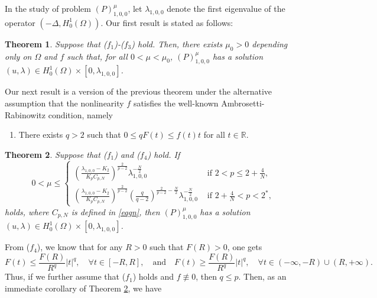 \documentclass[11pt]{amsart}
\newtheorem{theorem}{Theorem}[section]
\newcommand{\abs}[1]{\lvert#1\rvert}
\numberwithin{equation}{section}
\begin{document}
In the study of problem $(P)^{\mu}_{1,0,0}$,  let  $\lambda_{1,0,0}$ denote the first eigenvalue of the operator $(-\Delta, H_{0}^{1}(\Omega))$. Our first result is stated as follows:



\begin{theorem} \label{th2}
 Suppose that ($f_1$)-($f_3$) hold. Then, there exists $\mu_0>0$ depending only on $\Omega$ and $f$ such that, for all $0<\mu<\mu_0$, $(P)^{\mu}_{1,0,0}$ has a solution $(u,\lambda) \in H^1_0(\Omega) \times [0,\lambda_{1,0,0}]$.
\end{theorem}

Our next result is a version of the previous theorem under the alternative assumption that the nonlinearity  $f$ satisfies the well-known Ambrosetti-Rabinowitz condition, namely
\begin{enumerate}[align=left,labelsep=0pt]
    \item[($f_4$)] There exists $q>2$ such that $0 \leq qF(t)\leq f(t)t$ for all $t \in \mathbb{R}$.
\end{enumerate}
\begin{theorem}\label{th3}
    Suppose that ($f_1$) and ($f_4$) hold. If $$0<\mu \leq
  \begin{cases}
    \left(\frac{\lambda_{1,0,0}-K_2}{K_pC_{p,N}}\right)^{\frac{2}{p-2}}\lambda_{1,0,0}^{-\frac{N}{2}}  &\text{ if } 2<p\leq 2+\frac{4}{N},\\
    \left(\frac{\lambda_{1,0,0}-K_2}{K_pC_{p,N}}\right)^{\frac{2}{p-2}}\left(\frac{q}{q-2}\right)^{\frac{2}{p-2}-\frac{N}{2}}\lambda_{1,0,0}^{-\frac{N}{2}} &\text{ if }  2+\frac{4}{N}<p<2^*,
\end{cases}$$
holds, where $C_{p,N}$ is defined in \eqref{eqgn}, then $(P)^{\mu}_{1,0,0}$ has a solution $(u,\lambda) \in H^1_0(\Omega) \times [0,\lambda_{1,0,0}]$.
\end{theorem}
From ($f_4$),  we know that for any $R>0$ such that $F(R)>0$, one gets
$$
F(t)\leq \frac{F(R)}{R^q} \abs{t}^q, \quad \forall t\in [-R,R],\quad \text{and}\quad F(t)\geq \frac{F(R)}{R^q} \abs{t}^q, \quad \forall t\in (-\infty,-R)\cup(R,+\infty).
$$
Thus, if we further assume that ($f_1$) holds and $ f\not \equiv 0$, then $q\leq p$. Then, as an immediate corollary of Theorem \ref{th3}, we have
\end{document}
